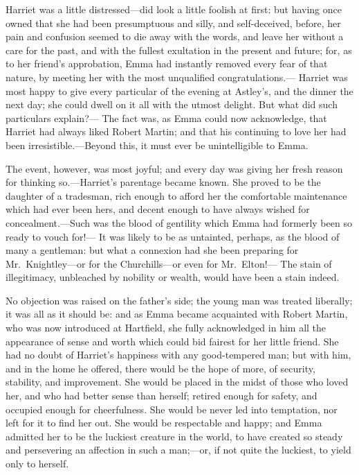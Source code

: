 Harriet was a little distressed---did look a little foolish at first:
but having once owned that she had been presumptuous and silly,
and self-deceived, before, her pain and confusion seemed to die
away with the words, and leave her without a care for the past,
and with the fullest exultation in the present and future; for, as to
her friend's approbation, Emma had instantly removed every fear of
that nature, by meeting her with the most unqualified congratulations.---%
Harriet was most happy to give every particular of the evening at
Astley's, and the dinner the next day; she could dwell on it all
with the utmost delight.  But what did such particulars explain?---%
The fact was, as Emma could now acknowledge, that Harriet had
always liked Robert Martin; and that his continuing to love her had
been irresistible.---Beyond this, it must ever be unintelligible
to Emma.

The event, however, was most joyful; and every day was giving her
fresh reason for thinking so.---Harriet's parentage became known.
She proved to be the daughter of a tradesman, rich enough to afford
her the comfortable maintenance which had ever been hers, and decent
enough to have always wished for concealment.---Such was the blood
of gentility which Emma had formerly been so ready to vouch for!---%
It was likely to be as untainted, perhaps, as the blood of many
a gentleman:  but what a connexion had she been preparing for
Mr.\ Knightley---or for the Churchills---or even for Mr.\ Elton!---%
The stain of illegitimacy, unbleached by nobility or wealth,
would have been a stain indeed.

No objection was raised on the father's side; the young man was
treated liberally; it was all as it should be:  and as Emma became
acquainted with Robert Martin, who was now introduced at Hartfield,
she fully acknowledged in him all the appearance of sense and worth
which could bid fairest for her little friend.  She had no doubt
of Harriet's happiness with any good-tempered man; but with him,
and in the home he offered, there would be the hope of more,
of security, stability, and improvement.  She would be placed in the
midst of those who loved her, and who had better sense than herself;
retired enough for safety, and occupied enough for cheerfulness.
She would be never led into temptation, nor left for it to find her out.
She would be respectable and happy; and Emma admitted her to be
the luckiest creature in the world, to have created so steady and
persevering an affection in such a man;---or, if not quite the luckiest,
to yield only to herself.

